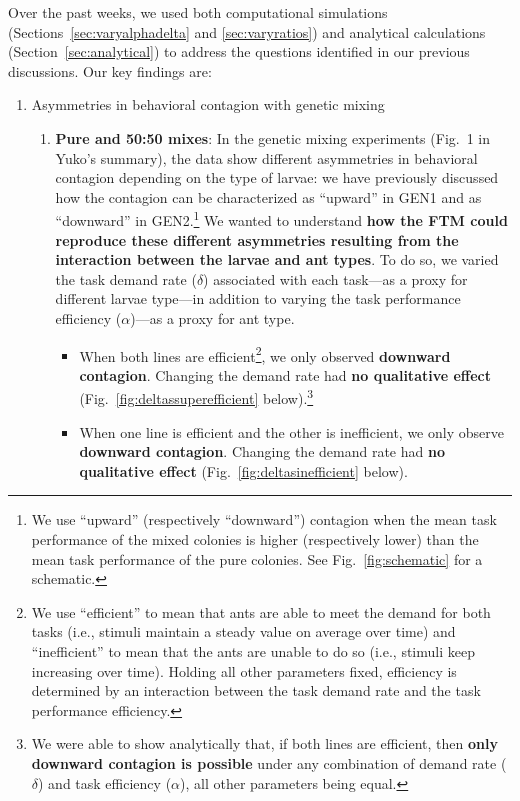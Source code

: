 \documentclass[11pt]{article}
\begin{document}
\noindent Over the past weeks, we used both computational simulations (Sections~\ref{sec:varyalphadelta} and \ref{sec:varyratios}) and analytical calculations (Section~\ref{sec:analytical}) to address the questions identified in our previous discussions. Our key findings are:
\begin{enumerate}
    \item Asymmetries in behavioral contagion with genetic mixing
    
    \begin{enumerate}
    \item \textbf{Pure and 50:50 mixes}:
    In the genetic mixing experiments (Fig.~1 in Yuko's summary), the data show different asymmetries in behavioral contagion depending on the type of larvae: we have previously discussed how the contagion can be characterized as  ``upward'' in GEN1 and as ``downward'' in GEN2.\footnote{We use ``upward'' (respectively ``downward'') contagion when the mean task performance of the mixed colonies is higher (respectively lower) than the mean task performance of the pure colonies. See Fig.~\ref{fig:schematic} for a schematic.} We wanted to understand \textbf{how the FTM could reproduce these different asymmetries resulting from the interaction between the larvae and ant types}. To do so, we varied the task demand rate ($\delta$) associated with each task---as a proxy for different larvae type---in addition to varying the task performance efficiency ($\alpha$)---as a proxy for ant type. 
    \begin{itemize}
        \item 
        When both lines are efficient\footnote{We use ``efficient'' to mean that ants are able to meet the demand for both tasks (i.e., stimuli maintain a steady value on average over time) and ``inefficient'' to mean that the ants are unable to do so (i.e., stimuli keep increasing over time). Holding all other parameters fixed, efficiency is determined by an interaction between the task demand rate and the task performance efficiency.}, we only observed \textbf{downward contagion}. Changing the demand rate had \textbf{no qualitative effect} (Fig.~\ref{fig:deltassuperefficient} below).\footnote{We were able to show analytically that, if both lines are efficient, then \textbf{only downward contagion is possible} under any combination of demand rate ($\delta$) and task efficiency ($\alpha$), all other parameters being equal.}
        \item 
        When one line is efficient and the other is inefficient, we only observe \textbf{downward contagion}. Changing the demand rate had \textbf{no qualitative effect} (Fig.~\ref{fig:deltasinefficient} below). 
        

\end{itemize}
\end{enumerate}
\end{enumerate}
\end{document}
